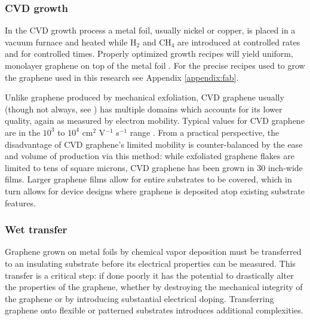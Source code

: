 \documentclass[edeposit,fullpage,draftthesis]{uiucthesis2009}
\begin{document}
        
            \subsubsection{CVD growth}

            In the CVD growth process a metal foil, usually nickel or copper, is
        placed in a vacuum furnace and heated while H$_2$ and CH$_4$ are 
        introduced at controlled rates and for controlled times. Properly
        optimized growth recipes will yield uniform, monolayer graphene on
        top of the metal foil \cite{reina2008large, kim2009large, li2009large, li2009transfer}. 
        For the precise recipes used to grow the graphene used in this research see Appendix \ref{appendix:fab}.
        
        Unlike graphene produced by mechanical
        exfoliation, CVD graphene usually (though not always, see 
        \cite{Petrone2012}) has multiple domains \cite{Li2010} which accounts
        for its lower quality, again as measured by electron mobility. Typical
        values for CVD graphene are in the $10^3$ to $10^4$ cm$^2$ V$^{-1}$
        s$^{-1}$ range \cite{Petrone2012}. From a practical perspective, the 
        disadvantage of CVD graphene's limited mobility
        is counter-balanced by the ease and volume of production via this method:
        while exfoliated graphene flakes are limited to tens of square microns, 
        CVD graphene has been grown in 30 inch-wide films\cite{bae2010roll}.
        Larger graphene films allow for entire substrates to be covered, which 
        in turn allows for device designs where graphene is deposited atop existing
        substrate features.
        
            \subsubsection{Wet transfer}
            
            Graphene grown on metal foils by chemical vapor deposition must be transferred to 
        an insulating substrate before its electrical properties can be measured.
        This transfer is a critical step: if done poorly it has the potential to 
        drastically alter the properties of the graphene, whether by destroying
        the mechanical integrity of the graphene or by introducing substantial electrical doping.
        Transferring graphene onto flexible or patterned substrates introduces additional
        complexities. 
        
\end{document}
